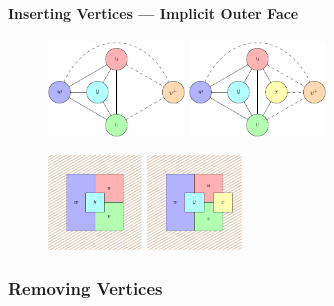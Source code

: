 \documentclass[t,18pt]{beamer}
\newcommand{\emdash}{---}
\begin{document}
\begin{frame}[c]
  \frametitle{}
  \framesubtitle{Inserting Vertices \emdash{} Implicit Outer Face}
  \begin{figure}
    \includegraphics[height=2.5cm]{../Thesis/Resources/InsertVertex-Duality-1.pdf}
    \quad
    \includegraphics[height=2.5cm]{../Thesis/Resources/InsertVertex-Duality-2.pdf}
  \end{figure}
  \begin{figure}
    \includegraphics[height=2.5cm]{../Thesis/Resources/InsertVertex-Duality-3.pdf}
    \qquad\qquad
    \includegraphics[height=2.5cm]{../Thesis/Resources/InsertVertex-Duality-4.pdf}
  \end{figure}
\end{frame}

\subsubsection{Removing Vertices}
\label{subsubsect:removing-vertices}
\end{document}
